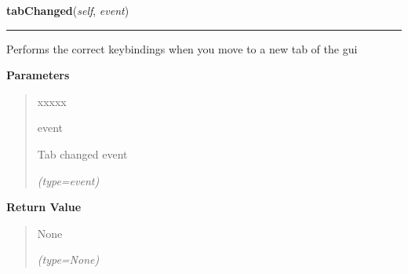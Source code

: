 \hspace{.8\funcindent}\begin{boxedminipage}{\funcwidth}

    \raggedright \textbf{tabChanged}(\textit{self}, \textit{event})

    \vspace{-1.5ex}

    \rule{\textwidth}{0.5\fboxrule}
\setlength{\parskip}{2ex}
    Performs the correct keybindings when you move to a new tab of the gui

\setlength{\parskip}{1ex}
      \textbf{Parameters}
      \vspace{-1ex}

      \begin{quote}
        \begin{Ventry}{xxxxx}

          \item[event]

          Tab changed event

            {\it (type=event)}

        \end{Ventry}

      \end{quote}

      \textbf{Return Value}
    \vspace{-1ex}

      \begin{quote}
      None

      {\it (type=None)}

      \end{quote}

    \end{boxedminipage}

    \label{client_gui:GuiClass:updateSettings}

    \vspace{0.5ex}

